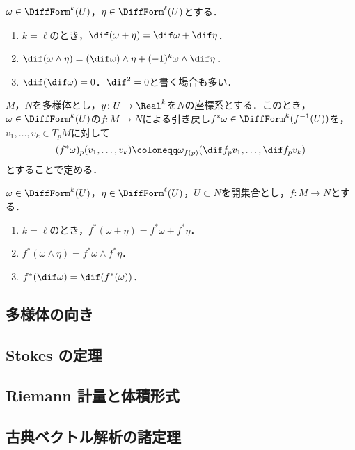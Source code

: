 \begin{prop}[外微分の基本性質] $\omega \in \DiffForm^k(U)$，$\eta \in \DiffForm^\ell(U)$とする．
\begin{enumerate}
\item $k=\ell$のとき，$\dif (\omega + \eta) = \dif \omega + \dif \eta$．
\item $\dif (\omega \wedge \eta) = (\dif \omega) \wedge \eta + (-1)^k \omega \wedge \dif \eta$．
\item $\dif (\dif \omega) = 0$．$\dif^2 = 0$と書く場合も多い．
\end{enumerate}
\end{prop}

\begin{defi}$M$，$N$を多様体とし，$y \colon U \to \Real^k$を$N$の座標系とする．このとき，$\omega \in \DiffForm^k(U)$の$f \colon M \to N$による引き戻し$f^* \omega \in \DiffForm^k(f^{-1}(U))$を，$v_1, \dots, v_k \in T_pM$に対して
\begin{equation}
(f^* \omega)_p (v_1, \dots, v_k) \coloneqq \omega_{f(p)} (\dif f_p v_1, \dots, \dif f_p v_k)
\end{equation}とすることで定める．
\end{defi}

\begin{prop}[引き戻しの基本性質] $\omega \in \DiffForm^k(U)$，$\eta \in \DiffForm^\ell(U)$，$U \subset N$を開集合とし，$f \colon M \to N$とする．
\begin{enumerate}
\item $k = \ell$のとき，$f^*(\omega + \eta) = f^* \omega + f^* \eta$．
\item $f^*(\omega \wedge \eta) = f^* \omega \wedge f^* \eta$．
\item $f^*(\dif \omega) = \dif (f^*(\omega))$．
\end{enumerate}
\end{prop}

\subsection{多様体の向き}

\subsection{Stokes の定理}

\subsection{Riemann 計量と体積形式}

\subsection{古典ベクトル解析の諸定理}
